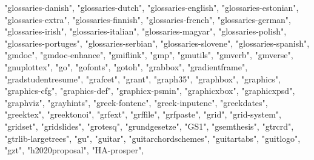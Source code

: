 \documentclass[
]{article}
\newenvironment{Shaded}{\begin{snugshade}}{\end{snugshade}}
\newcommand{\NormalTok}[1]{#1}
\newcommand{\StringTok}[1]{\textcolor[rgb]{0.31,0.60,0.02}{#1}}
\begin{document}
\begin{Shaded}
\begin{Highlighting}[]
\StringTok{"glossaries{-}danish"}\NormalTok{, }\StringTok{"glossaries{-}dutch"}\NormalTok{, }\StringTok{"glossaries{-}english"}\NormalTok{, }
\StringTok{"glossaries{-}estonian"}\NormalTok{, }\StringTok{"glossaries{-}extra"}\NormalTok{, }\StringTok{"glossaries{-}finnish"}\NormalTok{, }
\StringTok{"glossaries{-}french"}\NormalTok{, }\StringTok{"glossaries{-}german"}\NormalTok{, }\StringTok{"glossaries{-}irish"}\NormalTok{, }
\StringTok{"glossaries{-}italian"}\NormalTok{, }\StringTok{"glossaries{-}magyar"}\NormalTok{, }\StringTok{"glossaries{-}polish"}\NormalTok{, }
\StringTok{"glossaries{-}portuges"}\NormalTok{, }\StringTok{"glossaries{-}serbian"}\NormalTok{, }\StringTok{"glossaries{-}slovene"}\NormalTok{, }
\StringTok{"glossaries{-}spanish"}\NormalTok{, }\StringTok{"gmdoc"}\NormalTok{, }\StringTok{"gmdoc{-}enhance"}\NormalTok{, }\StringTok{"gmiflink"}\NormalTok{, }\StringTok{"gmp"}\NormalTok{, }
\StringTok{"gmutils"}\NormalTok{, }\StringTok{"gmverb"}\NormalTok{, }\StringTok{"gmverse"}\NormalTok{, }\StringTok{"gnuplottex"}\NormalTok{, }\StringTok{"go"}\NormalTok{, }\StringTok{"gofonts"}\NormalTok{, }
\StringTok{"gotoh"}\NormalTok{, }\StringTok{"grabbox"}\NormalTok{, }\StringTok{"gradientframe"}\NormalTok{, }\StringTok{"gradstudentresume"}\NormalTok{, }\StringTok{"grafcet"}\NormalTok{, }
\StringTok{"grant"}\NormalTok{, }\StringTok{"graph35"}\NormalTok{, }\StringTok{"graphbox"}\NormalTok{, }\StringTok{"graphics"}\NormalTok{, }\StringTok{"graphics{-}cfg"}\NormalTok{, }\StringTok{"graphics{-}def"}\NormalTok{, }
\StringTok{"graphicx{-}psmin"}\NormalTok{, }\StringTok{"graphicxbox"}\NormalTok{, }\StringTok{"graphicxpsd"}\NormalTok{, }\StringTok{"graphviz"}\NormalTok{, }\StringTok{"grayhints"}\NormalTok{, }
\StringTok{"greek{-}fontenc"}\NormalTok{, }\StringTok{"greek{-}inputenc"}\NormalTok{, }\StringTok{"greekdates"}\NormalTok{, }\StringTok{"greektex"}\NormalTok{, }
\StringTok{"greektonoi"}\NormalTok{, }\StringTok{"grfext"}\NormalTok{, }\StringTok{"grffile"}\NormalTok{, }\StringTok{"grfpaste"}\NormalTok{, }\StringTok{"grid"}\NormalTok{, }\StringTok{"grid{-}system"}\NormalTok{, }
\StringTok{"gridset"}\NormalTok{, }\StringTok{"gridslides"}\NormalTok{, }\StringTok{"grotesq"}\NormalTok{, }\StringTok{"grundgesetze"}\NormalTok{, }\StringTok{"GS1"}\NormalTok{, }\StringTok{"gsemthesis"}\NormalTok{, }
\StringTok{"gtrcrd"}\NormalTok{, }\StringTok{"gtrlib{-}largetrees"}\NormalTok{, }\StringTok{"gu"}\NormalTok{, }\StringTok{"guitar"}\NormalTok{, }\StringTok{"guitarchordschemes"}\NormalTok{, }
\StringTok{"guitartabs"}\NormalTok{, }\StringTok{"guitlogo"}\NormalTok{, }\StringTok{"gzt"}\NormalTok{, }\StringTok{"h2020proposal"}\NormalTok{, }\StringTok{"HA{-}prosper"}\NormalTok{, }

\end{Highlighting}
\end{Shaded}
\end{document}
